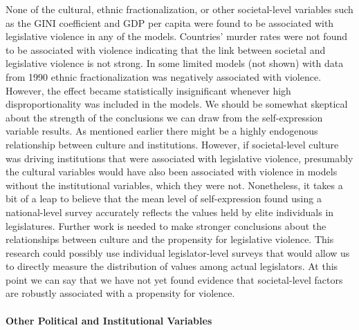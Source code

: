 \documentclass[a4paper]{article}\usepackage[]{graphicx}\usepackage[]{color}
\begin{document}
None of the cultural, ethnic fractionalization, or other societal-level variables such as the GINI coefficient and GDP per capita were found to be associated with legislative violence in any of the models. Countries' murder rates were not found to be associated with violence indicating that the link between societal and legislative violence is not strong. In some limited models (not shown) with data from 1990 ethnic fractionalization was negatively associated with violence. However, the effect became statistically insignificant whenever high disproportionality was included in the models. We should be somewhat skeptical about the strength of the conclusions we can draw from the self-expression variable results. As mentioned earlier there might be a highly endogenous relationship between culture and institutions. However, if societal-level culture was driving institutions that were associated with legislative violence, presumably the cultural variables would have also been associated with violence in models without the institutional variables, which they were not. Nonetheless, it takes a bit of a leap to believe that the mean level of self-expression found using a national-level survey accurately reflects the values held by elite individuals in legislatures. Further work is needed to make stronger conclusions about the relationships between culture and the propensity for legislative violence. This research could possibly use individual legislator-level surveys that would allow us to directly measure the distribution of values among actual legislators. At this point we can say that we have not yet found evidence that societal-level factors are robustly associated with a propensity for violence.

\paragraph{Other Political and Institutional Variables}
\end{document}
